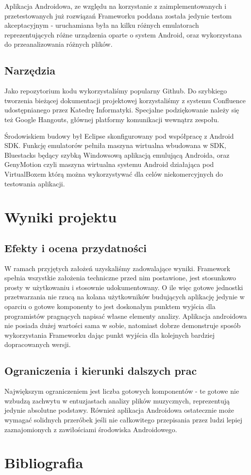 Aplikacja Androidowa, ze względu na korzystanie z zaimplementowanych i przetestowanych już rozwiązań Frameworku poddana została jedynie testom akceptacyjnym - uruchamiana była na kilku różnych emulatorach reprezentujących różne urządzenia oparte o system Android, oraz wykorzystana do przeanalizowania różnych plików.
\section{Narzędzia}
Jako repozytorium kodu wykorzystaliśmy popularny Github. Do szybkiego tworzenia bieżącej dokumentacji projektowej korzystaliśmy z systemu Confluence udostępnianego przez Katedrę Informatyki. Specjalne podziękowanie należy się też Google Hangouts, głównej platformy komunikacji wewnątrz zespołu.

Środowiskiem budowy był Eclipse skonfigurowany pod współpracę z Android SDK. Funkcję emulatorów pełniła maszyna wirtualna wbudowana w SDK, Bluestacks będący szybką Windowsową aplikacją emulującą Androida, oraz GenyMotion czyli maszyna wirtualna systemu Android działająca pod VirtualBoxem którą można wykorzystywać dla celów niekomercyjnych do testowania aplikacji.

\chapter{Wyniki projektu}
\section{Efekty i ocena przydatności}
W ramach przyjętych założeń uzyskaliśmy zadowalające wyniki. Framework spełnia wszystkie założenia techniczne przed nim postawione, jest stosunkowo prosty w użytkowaniu i stosownie udokumentowany. O ile więc gotowe jednostki przetwarzania nie rzucą na kolana użytkowników budujących aplikację jedynie w oparciu o gotowe komponenty to jest doskonałym punktem wyjścia dla programistów pragnących napisać własne elementy analizy. Aplikacja androidowa nie posiada dużej wartości sama w sobie, natomiast dobrze demonstruje sposób wykorzystania Frameworku dając punkt wyjścia dla kolejnych bardziej dopracowanych wersji.

\section{Ograniczenia i kierunki dalszych prac}
Największym ograniczeniem jest liczba gotowych komponentów - te gotowe nie wzbudzą zachwytu w entuzjastach analizy plików muzycznych, reprezentują jedynie absolutne podstawy. Również aplikacja Androidowa ostatecznie może wymagać solidnych przeróbek jeśli nie całkowitego przepisania przez ludzi lepiej zaznajomionych z zawiłościami środowiska Androidowego.

\chapter{Bibliografia}

